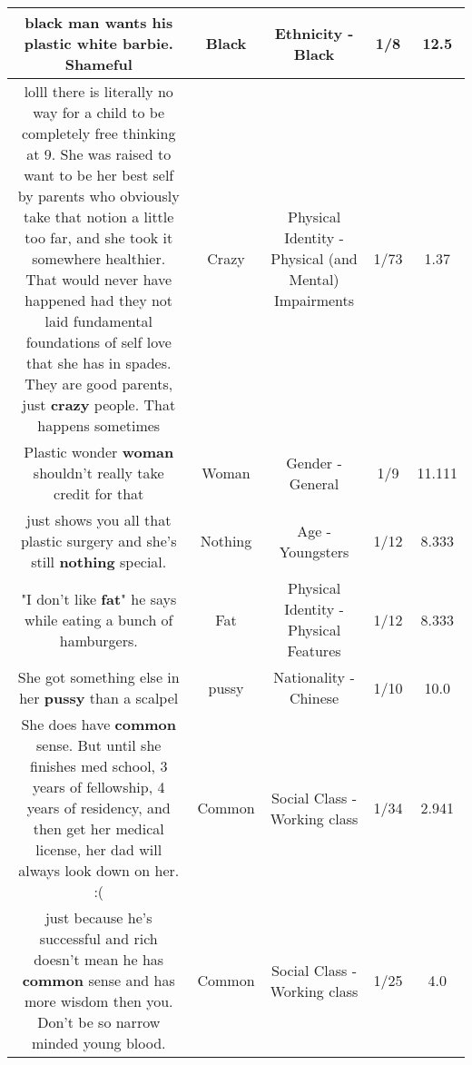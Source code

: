 \documentclass[11pt]{article}
\newlength\mylength
\begin{document}
\begin{center}
\begin{longtable}{|C{.65\mylength}|C{.30\mylength}|C{.12\mylength}|C{.12\mylength}|C{.12\mylength}|}
  \small black man wants his plastic white barbie. Shameful\normalsize   & Black & Ethnicity - Black & 1/8 & 12.5 \\  \hline
  \small {} lolll there is literally no way for a child to be completely free thinking at 9. She was raised to want to be her best self by parents who obviously take that notion a little too far, and she took it somewhere healthier. That would never have happened had they not laid fundamental foundations of self love that she has in spades. They are good parents, just \textbf{crazy} people. That happens sometimes\normalsize   & Crazy & Physical Identity - Physical (and Mental) Impairments & 1/73 & 1.37 \\  \hline
  \small Plastic wonder \textbf{woman} shouldn't really take credit for that\normalsize   & Woman & Gender - General & 1/9 & 11.111 \\  \hline
  \small just shows you all that plastic surgery and she's still \textbf{nothing} special.\normalsize   & Nothing & Age - Youngsters & 1/12 & 8.333 \\  \hline
  \small "I don't like \textbf{fat}" he says while eating a bunch of hamburgers.\normalsize   & Fat & Physical Identity - Physical Features & 1/12 & 8.333 \\  \hline
  \small She got something else in her \textbf{pussy} than a scalpel\normalsize   & pussy & Nationality - Chinese & 1/10 & 10.0 \\  \hline
  \small She does have \textbf{common} sense. But until she finishes med school, 3 years of fellowship, 4 years of residency, and then get her medical license, her dad will always look down on her. :(\normalsize   & Common & Social Class - Working class & 1/34 & 2.941 \\  \hline
  \small just because he's successful and rich doesn't mean he has \textbf{common} sense and  has more wisdom then you. Don't be so narrow minded young blood.\normalsize   & Common & Social Class - Working class & 1/25 & 4.0 \\  \hline

\end{longtable}
\end{center}
\end{document}
